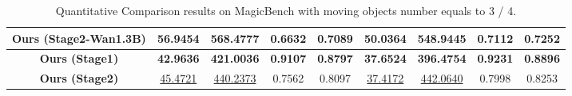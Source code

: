 \begin{table}[h]
{\begin{tabular}{c|cccc|cccc}
\textbf{Ours (Stage2-Wan1.3B)}                                                        & 56.9454                          & 568.4777                          & 0.6632                          & 0.7089                          & 50.0364                          & 548.9445                          & 0.7112                          & 0.7252                          \\ \hline
\textbf{Ours (Stage1)}                                                                                                   & \textbf{42.9636}                               & \textbf{421.0036}                              & \textbf{0.9107}                                    & \textbf{0.8797}                                    & \textbf{37.6524}                               & \textbf{396.4754}                              & \textbf{0.9231}                                    & \textbf{0.8896}                                   \\
\textbf{Ours (Stage2)}                                                                                                   & \underline{45.4721}                               & \underline{440.2373}                              & 0.7562                                    & 0.8097                                    & \underline{37.4172}                               & \underline{442.0640}                              & 0.7998                                    & 0.8253                                   \\ \hline
\end{tabular}
}
\caption{Quantitative Comparison results on MagicBench with moving objects number equals to 3 / 4.}
\label{tab:magicbench objnum3&4}
\end{table}

